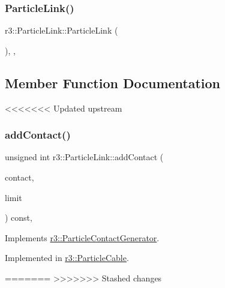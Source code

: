 \subsubsection{\texorpdfstring{Particle\+Link()}{ParticleLink()}}
{\footnotesize\ttfamily r3\+::\+Particle\+Link\+::\+Particle\+Link (\begin{DoxyParamCaption}{ }\end{DoxyParamCaption})\hspace{0.3cm}{\ttfamily [explicit]}, {\ttfamily [protected]}, {\ttfamily [default]}}



\subsection{Member Function Documentation}
<<<<<<< Updated upstream
\mbox{\label{classr3_1_1_particle_link_a07abe1381e0b5ed7e1597099dc0c072d}} 
\subsubsection{\texorpdfstring{add\+Contact()}{addContact()}}
{\footnotesize\ttfamily unsigned int r3\+::\+Particle\+Link\+::add\+Contact (\begin{DoxyParamCaption}\item[{\mbox{\hyperlink{classr3_1_1_particle_contact}{Particle\+Contact}} $\ast$}]{contact,  }\item[{unsigned int}]{limit }\end{DoxyParamCaption}) const\hspace{0.3cm}{\ttfamily [override]}, {}}



Implements \mbox{\hyperlink{classr3_1_1_particle_contact_generator_a3c9c99fb97a4431f0ddf300b30167d03}{r3\+::\+Particle\+Contact\+Generator}}.



Implemented in \mbox{\hyperlink{classr3_1_1_particle_cable_af8024236316ae2cf7bd68a0e906ed7c7}{r3\+::\+Particle\+Cable}}.

=======
>>>>>>> Stashed changes
\mbox{\label{classr3_1_1_particle_link_a5ad76e8eb6f9b78e3589c74e5d5013fc}} 
